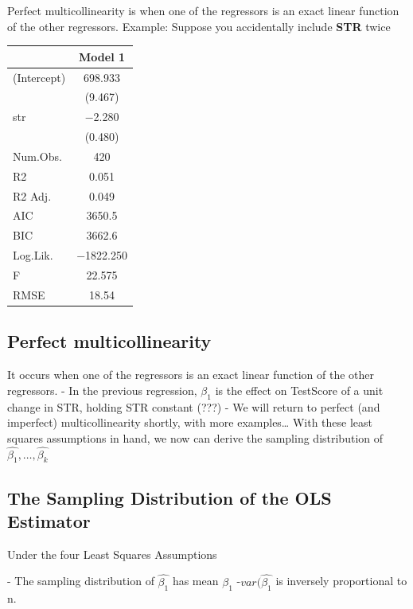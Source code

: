 \documentclass[
  letterpaper,
  DIV=11,
  numbers=noendperiod]{scrartcl}
\begin{document}
Perfect multicollinearity is when one of the regressors is an exact
linear function of the other regressors. Example: Suppose you
accidentally include \textbf{STR} twice

\begin{table}
\centering
\begin{tabular}[t]{lc}
\toprule
  & Model 1\\
\midrule
(Intercept) & \num{698.933}\\
 & (\num{9.467})\\
str & \num{-2.280}\\
 & (\num{0.480})\\
\midrule
Num.Obs. & \num{420}\\
R2 & \num{0.051}\\
R2 Adj. & \num{0.049}\\
AIC & \num{3650.5}\\
BIC & \num{3662.6}\\
Log.Lik. & \num{-1822.250}\\
F & \num{22.575}\\
RMSE & \num{18.54}\\
\bottomrule
\end{tabular}
\end{table}

\hypertarget{perfect-multicollinearity}{%
\subsection{Perfect multicollinearity}\label{perfect-multicollinearity}}

It occurs when one of the regressors is an exact linear function of the
other regressors. - In the previous regression, \(\beta_1\) is the
effect on TestScore of a unit change in STR, holding STR constant (???)
- We will return to perfect (and imperfect) multicollinearity shortly,
with more examples\ldots{} With these least squares assumptions in hand,
we now can derive the sampling distribution of
\(\hat{\beta_1}, \dots,\hat{\beta_k}\)

\hypertarget{the-sampling-distribution-of-the-ols-estimator}{%
\subsection{The Sampling Distribution of the OLS
Estimator}\label{the-sampling-distribution-of-the-ols-estimator}}

Under the four Least Squares Assumptions

- The sampling distribution of \(\hat{\beta_1}\) has mean \(\beta_1\)
-\(var(\hat{\beta_1}\) is inversely proportional to n.
\end{document}
